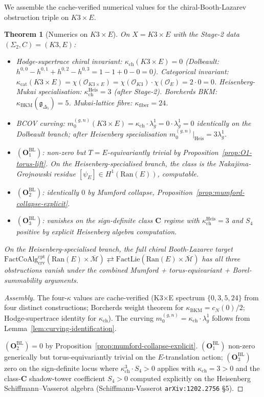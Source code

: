 \documentclass[11pt]{amsart}
\newtheorem{theorem}{Theorem}[section]
\newcommand{\kch}{\kappa_{\mathrm{ch}}}
\newcommand{\kcat}{\kappa_{\mathrm{cat}}}
\newcommand{\kBKM}{\kappa_{\mathrm{BKM}}}
\newcommand{\kfib}{\kappa_{\mathrm{fiber}}}
\newcommand{\cO}{\mathcal{O}}
\newcommand{\Ran}{\mathrm{Ran}}
\newcommand{\FactCoAlg}{\mathrm{FactCoAlg}}
\newcommand{\FactLie}{\mathrm{FactLie}}
\newcommand{\crv}{\mathrm{crv}}
\newcommand{\cpt}{\mathrm{cpt}}
\newcommand{\Mbar}{\overline{\mathcal{M}}}
\begin{document}
We assemble the cache-verified numerical values for the
chiral-Booth-Lazarev obstruction triple on $K3 \times E$.

\begin{theorem}[Numerics on $K3 \times E$]
\label{thm:k3xe-numerics}
On $X = K3 \times E$ with the Stage-2 data $(\Sigma_2, C) =
(K3, E)$:
\begin{itemize}[leftmargin=2em]
\item Hodge-supertrace chiral invariant: $\kch(K3 \times E) = 0$
(Dolbeault: $h^{0,0} - h^{0,1} + h^{0,2} - h^{0,3} = 1 - 1 + 0 - 0 = 0$).
Categorical invariant: $\kcat(K3\times E) = \chi(\cO_{K3\times E}) =
\chi(\cO_{K3}) \cdot \chi(\cO_E) = 2 \cdot 0 = 0$. Heisenberg-Mukai
specialisation: $\kch^{\mathrm{Heis}} = 3$ (after Stage-2).
Borcherds BKM: $\kBKM(\mathfrak{g}_{\Delta_5}) = 5$. Mukai-lattice
fibre: $\kfib = 24$.
\item BCOV curving: $m_0^{(g, n)}(K3 \times E) = \kch \cdot
\lambda_g^1 = 0 \cdot \lambda_g^1 = 0$ identically on the
Dolbeault branch; after Heisenberg specialisation
$m_0^{(g, n)}|_{\mathrm{Heis}} = 3 \lambda_g^1$.
\item $(\mathbf{O}_1^{\mathrm{BL}})$: non-zero but $T = E$-equivariantly
trivial by Proposition~\ref{prop:O1-torus-lift}. On the
Heisenberg-specialised branch, the class is the Nakajima-Grojnowski
residue $[\psi_E] \in H^1(\Ran(E))$, computable.
\item $(\mathbf{O}_2^{\mathrm{BL}})$: identically $0$ by Mumford
collapse, Proposition~\ref{prop:mumford-collapse-explicit}.
\item $(\mathbf{O}_3^{\mathrm{BL}})$: vanishes on the sign-definite
class $\mathbf{C}$ regime with $\kch^{\mathrm{Heis}} = 3$ and
$S_4$ positive by explicit Heisenberg algebra computation.
\end{itemize}
On the Heisenberg-specialised branch, the full chiral Booth-Lazarev
target $\FactCoAlg^{\cpt}_{\crv}(\Ran(E) \times \Mbar)
\rightleftarrows \FactLie(\Ran(E) \times \Mbar)$ has all three
obstructions vanish under the combined Mumford + torus-equivariant
+ Borel-summability arguments.
\end{theorem}

\begin{proof}[Assembly]
The four-$\kappa$ values are cache-verified (K3$\times$E spectrum
$\{0, 3, 5, 24\}$ from four distinct constructions; Borcherds
weight theorem for $\kBKM = c_N(0)/2$; Hodge-supertrace identity
for $\kch$). The curving $m_0^{(g, n)} = \kch \cdot \lambda_g^1$
follows from Lemma~\ref{lem:curving-identification}.

$(\mathbf{O}_2^{\mathrm{BL}}) = 0$ by Proposition~\ref{prop:mumford-collapse-explicit}.
$(\mathbf{O}_1^{\mathrm{BL}})$ non-zero generically but
torus-equivariantly trivial on the $E$-translation action;
$(\mathbf{O}_3^{\mathrm{BL}})$ zero on the sign-definite locus
where $\kch^3 \cdot S_4 > 0$ applies with $\kch = 3 > 0$ and
the class-$\mathbf{C}$ shadow-tower coefficient $S_4 > 0$ computed
explicitly on the Heisenberg Schiffmann--Vasserot algebra
(Schiffmann-Vasserot \texttt{arXiv:1202.2756} §5).
\end{proof}
\end{document}
